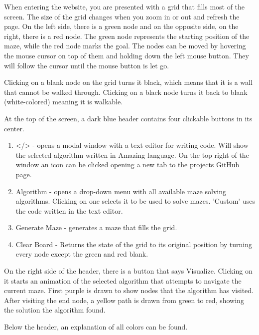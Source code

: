 When entering the website, you are presented with a grid that fills most of the screen. The size of the grid changes when you zoom in or out and refresh the page. On the left side, there is a green node and on the opposite side, on the right, there is a red node. The green node represents the starting position of the maze, while the red node marks the goal. The nodes can be moved by hovering the mouse cursor on top of them and holding down the left mouse button. They will follow the cursor until the mouse button is let go.

Clicking on a blank node on the grid turns it black, which means that it is a wall that cannot be walked through. Clicking on a black node turns it back to blank (white-colored) meaning it is walkable.

At the top of the screen, a dark blue header contains four clickable buttons in its center.

\begin{enumerate}
    \item </> - opens a modal window with a text editor for writing code. Will show the selected algorithm written in Amazing language. On the top right of the window an icon can be clicked opening a new tab to the projects GitHub page.
    \item Algorithm - opens a drop-down menu with all available maze solving algorithms. Clicking on one selects it to be used to solve mazes. 'Custom' uses the code written in the text editor.
    \item Generate Maze -  generates a maze that fills the grid.
    \item Clear Board - Returns the state of the grid to its original position by turning every node except the green and red blank.
\end{enumerate}

On the right side of the header, there is a button that says Visualize. Clicking on it starts an animation of the selected algorithm that attempts to navigate the current maze. First purple is drawn to show nodes that the algorithm has visited.  After visiting the end node, a yellow path is drawn from green to red, showing the solution the algorithm found.

Below the header, an explanation of all colors can be found.